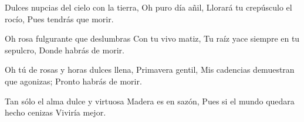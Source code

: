 \startlanguage[es]
\startlines
Dulces nupcias del cielo con la tierra,
Oh puro día añil,
Llorará tu crepúsculo el rocío,
Pues tendrás que morir.

Oh rosa fulgurante que deslumbras
Con tu vivo matiz,
Tu raíz yace siempre en tu sepulcro,
Donde habrás de morir.

Oh tú de rosas y horas dulces llena,
Primavera gentil,
Mis cadencias demuestran que agonizas;
Pronto habrás de morir.

Tan sólo el alma dulce y virtuosa
Madera es en sazón,
Pues si el mundo quedara hecho cenizas
Viviría mejor.
\stoplines
\stoplanguage
